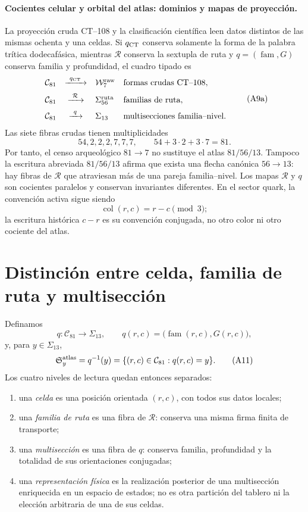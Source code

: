 \paragraph{Cocientes celular y orbital del atlas: dominios y mapas de proyección.}
La proyección cruda CT--108 y la clasificación científica leen datos
distintos de las mismas ochenta y una celdas. Si
\(q_{\rm CT}\) conserva solamente la forma de la palabra trítica
dodecafásica, mientras \(\mathcal R\) conserva la sextupla de ruta y
\(q=(\operatorname{fam},G)\) conserva familia y profundidad, el cuadro
tipado es
\[
\begin{array}{rcll}
 \mathcal C_{81}
 &\xrightarrow{\ q_{\rm CT}\ }&
 \mathcal W^{\rm raw}_{7}
 & \text{formas crudas CT--108},\\[2mm]
 \mathcal C_{81}
 &\xrightarrow{\ \mathcal R\ }&
 \Sigma^{\rm ruta}_{56}
 & \text{familias de ruta},\\[2mm]
 \mathcal C_{81}
 &\xrightarrow{\ q\ }&
 \Sigma_{13}
 & \text{multisecciones familia--nivel}.
\end{array}
\tag{A9a}\label{eq:dos-cocientes-atlas-rev8}
\]
Las siete fibras crudas tienen multiplicidades
\[
 54,2,2,2,7,7,7,
 \qquad54+3\cdot2+3\cdot7=81.
\]
Por tanto, el censo arqueológico \(81\to7\) no sustituye el atlas
\(81/56/13\). Tampoco la escritura abreviada \(81/56/13\) afirma que exista
una flecha canónica \(56\to13\): hay fibras de \(\mathcal R\) que atraviesan
más de una pareja familia--nivel. Los mapas \(\mathcal R\) y \(q\) son
cocientes paralelos y conservan invariantes diferentes. En el sector quark,
la convención activa sigue siendo
\[
 \operatorname{col}(r,c)=r-c\pmod3;
\]
la escritura histórica \(c-r\) es su convención conjugada, no otro color ni
otro cociente del atlas.

\section{Distinción entre celda, familia de ruta y multisección}

Definamos
\[
 q:\mathcal C_{81}\longrightarrow\Sigma_{13},
 \qquad
 q(r,c)=\bigl(\operatorname{fam}(r,c),G(r,c)\bigr),
 \tag{A10}\label{eq:cociente-trece-multisecciones}
\]
y, para \(y\in\Sigma_{13}\),
\[
 \mathfrak S_y^{\rm atlas}
 =q^{-1}(y)
 =\{(r,c)\in\mathcal C_{81}:q(r,c)=y\}.
 \tag{A11}\label{eq:multiseccion-atlas-rev6}
\]
Los cuatro niveles de lectura quedan entonces separados:

\begin{enumerate}[label=(\roman*)]
 \item una \emph{celda} es una posición orientada \((r,c)\), con todos sus
 datos locales;
 \item una \emph{familia de ruta} es una fibra de \(\mathcal R\): conserva
 una misma firma finita de transporte;
 \item una \emph{multisección} es una fibra de \(q\): conserva familia,
 profundidad y la totalidad de sus orientaciones conjugadas;
 \item una \emph{representación física} es la realización posterior de una
 multisección enriquecida en un espacio de estados; no es otra partición del
 tablero ni la elección arbitraria de una de sus celdas.
\end{enumerate}

